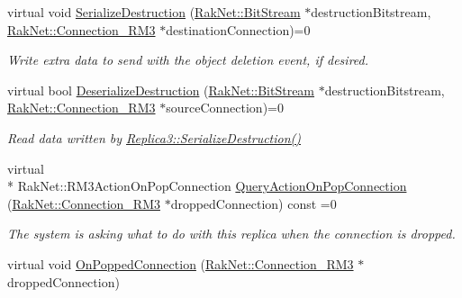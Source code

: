 \begin{DoxyCompactItemize}
\item 
virtual void \hyperlink{class_rak_net_1_1_replica3_ac78ab07796290ede00559de9d4ceb72d}{Serialize\-Destruction} (\hyperlink{class_rak_net_1_1_bit_stream}{Rak\-Net\-::\-Bit\-Stream} $\ast$destruction\-Bitstream, \hyperlink{class_rak_net_1_1_connection___r_m3}{Rak\-Net\-::\-Connection\-\_\-\-R\-M3} $\ast$destination\-Connection)=0
\begin{DoxyCompactList}\small\item\em Write extra data to send with the object deletion event, if desired. \end{DoxyCompactList}\item 
virtual bool \hyperlink{class_rak_net_1_1_replica3_ac7fa042647ea0bf2748d194e2eefeb74}{Deserialize\-Destruction} (\hyperlink{class_rak_net_1_1_bit_stream}{Rak\-Net\-::\-Bit\-Stream} $\ast$destruction\-Bitstream, \hyperlink{class_rak_net_1_1_connection___r_m3}{Rak\-Net\-::\-Connection\-\_\-\-R\-M3} $\ast$source\-Connection)=0
\begin{DoxyCompactList}\small\item\em Read data written by \hyperlink{class_rak_net_1_1_replica3_ac78ab07796290ede00559de9d4ceb72d}{Replica3\-::\-Serialize\-Destruction()} \end{DoxyCompactList}\item 
virtual \\*
Rak\-Net\-::\-R\-M3\-Action\-On\-Pop\-Connection \hyperlink{class_rak_net_1_1_replica3_a72df203ad36574b2e7d09b5b9abc7788}{Query\-Action\-On\-Pop\-Connection} (\hyperlink{class_rak_net_1_1_connection___r_m3}{Rak\-Net\-::\-Connection\-\_\-\-R\-M3} $\ast$dropped\-Connection) const =0
\begin{DoxyCompactList}\small\item\em The system is asking what to do with this replica when the connection is dropped. \end{DoxyCompactList}\item 
\hypertarget{class_rak_net_1_1_replica3_a707a3bcfeea37219b778a4d0e4834d2d}{virtual void \hyperlink{class_rak_net_1_1_replica3_a707a3bcfeea37219b778a4d0e4834d2d}{On\-Popped\-Connection} (\hyperlink{class_rak_net_1_1_connection___r_m3}{Rak\-Net\-::\-Connection\-\_\-\-R\-M3} $\ast$dropped\-Connection)}\label{class_rak_net_1_1_replica3_a707a3bcfeea37219b778a4d0e4834d2d}


\end{DoxyCompactItemize}
